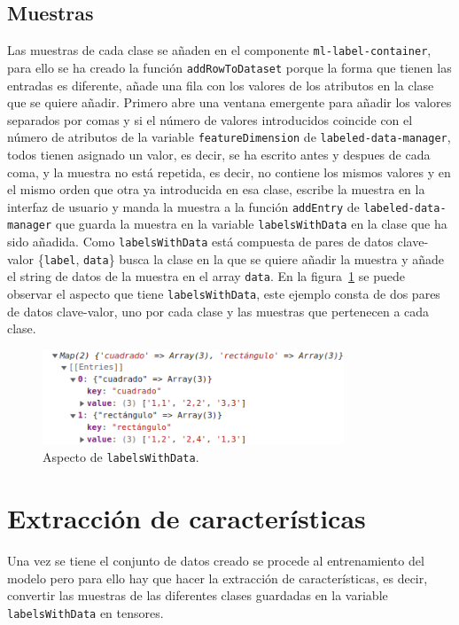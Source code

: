 \documentclass[a4paper, 12pt]{book}
\begin{document}
\subsection{Muestras}
\label{subsec:datos}

Las muestras de cada clase se añaden en el componente \texttt{ml-label-container}, para ello se ha creado la función \texttt{addRowToDataset} porque la forma que tienen las entradas es diferente, añade una fila con los valores de los atributos en la clase que se quiere añadir. Primero abre una ventana emergente para añadir los valores separados por comas y si el número de valores introducidos coincide con el número de atributos de la variable \texttt{featureDimension} de \texttt{labeled-data-manager}, todos tienen asignado un valor, es decir, se ha escrito antes y despues de cada coma, y la muestra no está repetida, es decir, no contiene los mismos valores y en el mismo orden que otra ya introducida en esa clase, escribe la muestra en la interfaz de usuario y manda la muestra a la función \texttt{addEntry} de \texttt{labeled-data-manager} que guarda la muestra en la variable \texttt{labelsWithData} en la clase que ha sido añadida. Como \texttt{labelsWithData} está compuesta de pares de datos clave-valor \{\texttt{label}, \texttt{data}\} busca la clase en la que se quiere añadir la muestra y añade el string de datos de la muestra en el array \texttt{data}. En la figura~\ref{fig:ejemplo1} se puede observar el aspecto que tiene \texttt{labelsWithData}, este ejemplo consta de dos pares de datos clave-valor, uno por cada clase y las muestras que pertenecen a cada clase.

\begin{figure}
	\centering
	\includegraphics[width=9cm, keepaspectratio]{img/ejemplo1.png}
	\caption{Aspecto de \texttt{labelsWithData}.} 	\label{fig:ejemplo1}
\end{figure}


\section{Extracción de características}
\label{subsec:caracteristicas}

Una vez se tiene el conjunto de datos creado se procede al entrenamiento del modelo pero para ello hay que hacer la extracción de características, es decir, convertir las muestras de las diferentes clases guardadas en la variable \texttt{labelsWithData} en tensores.
\end{document}
